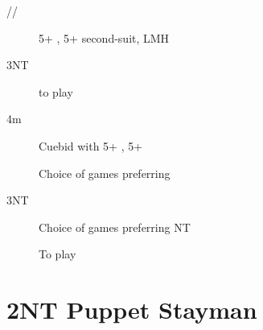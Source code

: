 \documentclass[tom-ari]{subfiles}
\begin{document}
\begin{description}
  \item[//] 5+ \heartsuit, 5+ second-suit, LMH
  \item[3NT] to play
  \item[4m] Cuebid with 5+ \heartsuit, 5+ \spadesuit
\end{description}

\begin{description}
  \item[] Choice of games preferring \heartsuit
  \item[3NT] Choice of games preferring NT
  \item[] To play
\end{description}
\section{2NT Puppet Stayman}
\end{document}
